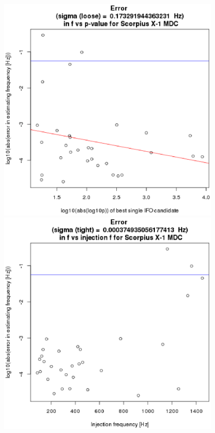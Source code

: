 \begin{figure}
\begin{center}
\includegraphics[width=0.3\paperwidth,height=0.2\paperheight]{ErrorF.eps}
\includegraphics[width=0.3\paperwidth,height=0.2\paperheight]{ErrorFvsF.eps}

\end{center}
\end{figure}
